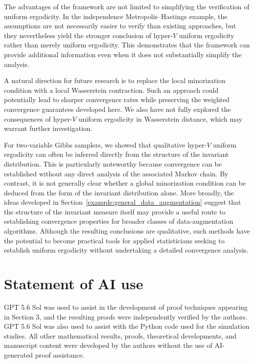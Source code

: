 \documentclass[ejsv2, noshowframe]{imsart}
\theoremstyle{plain}
\theoremstyle{definition}
\theoremstyle{remark}
\begin{document}
The advantages of the framework are not limited to simplifying the verification of uniform ergodicity. In the independence Metropolis--Hastings example, the assumptions are not necessarily easier to verify than existing approaches, but they nevertheless yield the stronger conclusion of hyper-$V$ uniform ergodicity rather than merely uniform ergodicity. This demonstrates that the framework can provide additional information even when it does not substantially simplify the analysis. 

A natural direction for future research is to replace the local minorization condition with a local Wasserstein contraction. Such an approach could potentially lead to sharper convergence rates while preserving the weighted convergence guarantees developed here. We also have not fully explored the consequences of hyper-$V$ uniform ergodicity in Wasserstein distance, which may warrant further investigation. 

For two-variable Gibbs samplers, we showed that qualitative hyper-$V$ uniform ergodicity can often be inferred directly from the structure of the invariant distribution. This is particularly noteworthy because convergence can be established without any direct analysis of the associated Markov chain. By contrast, it is not generally clear whether a global minorization condition can be deduced from the form of the invariant distribution alone. More broadly, the ideas developed in Section~\ref{example:general_data_augmentation} suggest that the structure of the invariant measure itself may provide a useful route to establishing convergence properties for broader classes of data-augmentation algorithms. Although the resulting conclusions are qualitative, such methods have the potential to become practical tools for applied statisticians seeking to establish uniform ergodicity without undertaking a detailed convergence analysis.

\section*{Statement of AI use} 

GPT 5.6 Sol was used to assist in the development of proof techniques appearing in Section 3, and the resulting proofs were independently verified by the authors. GPT 5.6 Sol was also used to assist with the Python code used for the simulation studies. All other mathematical results, proofs, theoretical developments, and manuscript content were developed by the authors without the use of AI-generated proof assistance. 
\end{document}
